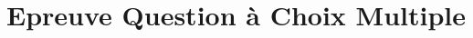 \documentclass[11pt]{scrreprt}
\begin{document}
    \section{Epreuve Question à Choix Multiple}
    \begin{figure}[H]
        \centering
        \mbox{\quad\quad\quad
}
\end{figure}
\end{document}
